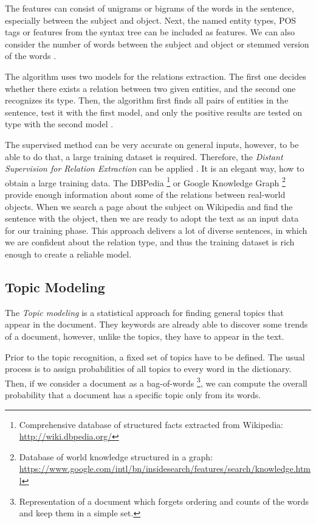 \documentclass[
  digital, %
  table,   %
  lof,     %
  lot,     %
]{fithesis3}
\begin{document}
The features can consist of unigrams or bigrams of the words in the sentence, especially between the subject and object. Next, the named entity types, POS tags or features from the syntax tree can be included as features. We can also consider the number of words between the subject and object or stemmed version of the words \cite[sec. 21.2]{jurafsky2014speech}.

The algorithm uses two models for the relations extraction.
The first one decides whether there exists a relation between two given entities, and the second one recognizes its type. Then, the algorithm first finds all pairs of entities in the sentence, test it with the first model, and only the positive results are tested on type with the second model \cite[sec. 21.2]{jurafsky2014speech}.

The supervised method can be very accurate on general inputs, however, to be able to do that, a large training dataset is required.
Therefore, the \textit{Distant Supervision for Relation Extraction} can be applied \cite{mintz2009distant}.
It is an elegant way, how to obtain a large training data.
The DBPedia \footnote{Comprehensive database of structured facts extracted from Wikipedia: \mbox{\url{http://wiki.dbpedia.org/}}} or 
Google Knowledge Graph \footnote{Database of world knowledge structured in a graph: \url{https://www.google.com/intl/bn/insidesearch/features/search/knowledge.html}}
provide enough information about some of the relations between real-world objects.
When we search a page about the subject on Wikipedia and find the sentence with the object, then we are ready to adopt the text as an input data for our training phase.
This approach delivers a lot of diverse sentences, in which we are confident about the relation type, and thus the training dataset is rich enough to create a reliable model.

\subsection{Topic Modeling}
\label{topic_modeling}
The \textit{Topic modeling} is a statistical approach for finding general topics that appear in the document.
They keywords are already able to discover some trends of a document, however, unlike the topics, they have to appear in the text.

Prior to the topic recognition, a fixed set of topics have to be defined.
The usual process is to assign probabilities of all topics to every word in the dictionary.
Then, if we consider a document as a bag-of-words
\footnote{Representation of a document which forgets ordering and counts of the words and keep them in a simple set.}, 
we can compute the overall probability that a document has a specific topic only from its words.
\end{document}
